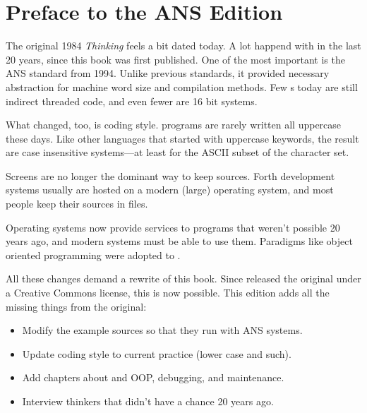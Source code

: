 \chapter*{Preface to the ANS \Forth{} Edition}\label{preface-ans}
\pagestyle{headings}

\initial The original 1984 \emph{Thinking \Forth} feels a bit dated
today. A lot happend with \Forth{} in the last 20 years, since this
book was first published. One of the most important is the ANS
\Forth{} standard from 1994. Unlike previous \Forth{} standards, it
provided necessary abstraction for machine word size and compilation
methods. Few \Forth{}s today are still indirect threaded code, and
even fewer are 16 bit systems.

What changed, too, is coding style. \Forth{} programs are rarely
written all uppercase these days. Like other languages that started
with uppercase keywords, the result are case insensitive systems---at
least for the ASCII subset of the character set.

Screens are no longer the dominant way to keep sources. Forth
development systems usually are hosted on a modern (large) operating
system, and most people keep their sources in files.

Operating systems now provide services to programs that weren't
possible 20 years ago, and modern \Forth{} systems must be able to use
them. Paradigms like object oriented programming were adopted to
\Forth{}.

All these changes demand a rewrite of this book. Since  released the original under a Creative Commons license, this
is now possible. This edition adds all the missing things from the
original:

\begin{itemize}
\item Modify the example sources so that they run with ANS \Forth{}
systems.

\item Update coding style to current practice (lower case and such).

\item Add chapters about \Forth{} and OOP, \Forth{} debugging, and
maintenance.

\item Interview \Forth{} thinkers that didn't have a chance 20 years
ago.
\end{itemize}

\begin{flushright}
\vspace{5em}
\vspace{2.5em}
\end{flushright}

